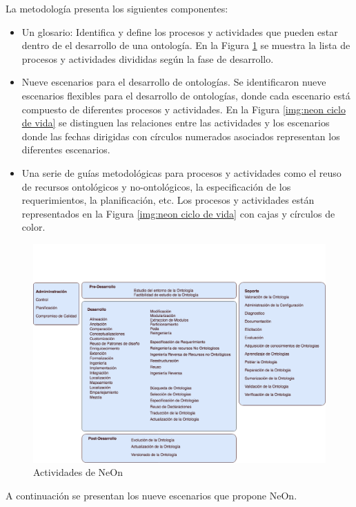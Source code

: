 La metodología presenta los siguientes componentes:
\begin{itemize}
    \item Un glosario: Identifica y define los procesos y actividades que pueden estar dentro de el desarrollo de una ontología. En la Figura \ref{img:neon actividades} se muestra la lista de procesos y actividades divididas según la fase de desarrollo.
    \item Nueve escenarios para el desarrollo de ontologías. Se identificaron nueve escenarios flexibles para el desarrollo de ontologías, donde cada escenario está compuesto de diferentes procesos y actividades. En la Figura \ref{img:neon ciclo de vida} se distinguen las relaciones entre las actividades y los escenarios donde las fechas dirigidas con círculos numerados asociados representan los diferentes escenarios. 
    \item Una serie de guías metodológicas para procesos y actividades como el reuso de recursos ontológicos y no-ontológicos, la especificación de los requerimientos, la planificación, etc. Los procesos y actividades están representados en la Figura \ref{img:neon ciclo de vida} con cajas y círculos de color.
\end{itemize}

\begin{figure}[h!]
    \centering
    \includegraphics[width=150mm]{figuras/Diagramas-NeonActivities}
    \caption{Actividades de NeOn}
    \label{img:neon actividades}
    \end{figure}

A continuación se presentan los nueve escenarios que propone NeOn.

